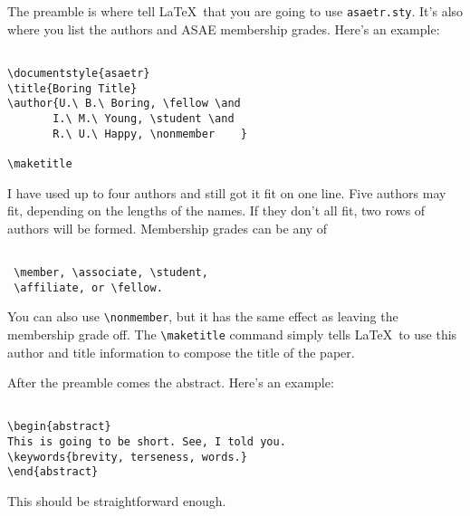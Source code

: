 The preamble is where tell \LaTeX\ that you are going to use {\tt asaetr.sty}.
It's also where you list the authors and ASAE membership grades. Here's
an example:
\small \begin{verbatim}

\documentstyle{asaetr}
\title{Boring Title}
\author{U.\ B.\ Boring, \fellow \and 
       I.\ M.\ Young, \student \and
       R.\ U.\ Happy, \nonmember    }

\maketitle

\end{verbatim} \normalsize
I have used up to four authors and still got it fit on one line.
Five authors may fit, depending on the lengths of the names. If
they don't all fit, two rows of authors will be formed. Membership
grades can be any of 
\small \begin{verbatim}

 \member, \associate, \student, 
 \affiliate, or \fellow. 

\end{verbatim} \normalsize
You can also use \verb#\nonmember#, but it has the same effect
as leaving the membership grade off. The \verb#\maketitle# command
simply tells \LaTeX\ to use this author and title information to
compose the title of the paper.


After the preamble comes the abstract. Here's an example:
\begin{verbatim}

\begin{abstract}
This is going to be short. See, I told you.
\keywords{brevity, terseness, words.}
\end{abstract}

\end{verbatim}
This should be straightforward enough.


